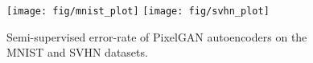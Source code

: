 \documentclass{article}
\begin{document}
\begin{figure}[t]
\centering
\texttt{[image: fig/mnist\_plot]}
\hspace{0.3cm}
\texttt{[image: fig/svhn\_plot]}
\vspace{-.3cm}
\caption{\label{fig:plot}Semi-supervised error-rate of PixelGAN autoencoders on the MNIST and SVHN datasets.}
\end{figure}
\begin{center}
\begin{table}[t]
\centering
{}
\end{table}
\end{center}
\end{document}
